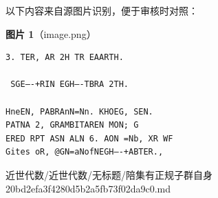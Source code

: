 \begin{note}
以下内容来自源图片识别，便于审核时对照：

\textbf{图片 1}（image.png）
\begin{Verbatim}[fontsize=\small]
3. TER, AR 2H TR EAARTH.

 SGE—-+RIN EGH—-TBRA 2TH.

HneEN, PABRAnN=Nn. KHOEG, SEN.
PATNA 2, GRAMBITAREN MON; G
ERED RPT ASN ALN 6. AON =Nb, XR WF
Gites oR, @GN=aNofNEGH—-+ABTER.,
\end{Verbatim}

\end{note}

\begin{note}[来源路径]

近世代数/近世代数/无标题/陪集有正规子群自身 20bd2efa3f4280d5b2a5fb73f02da9c0.md

\end{note}
